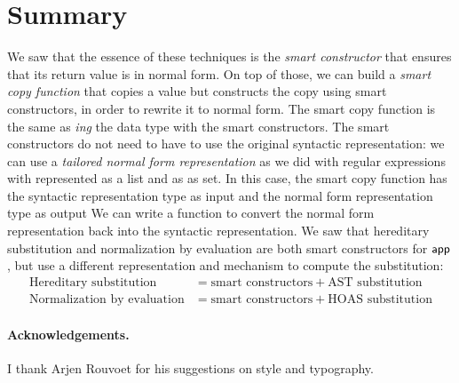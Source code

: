 \section{Summary}

We saw that the essence of these techniques is the \emph{smart constructor} that ensures that its return value is in normal form.
On top of those, we can build a \emph{smart copy function} that copies a value but constructs the copy using smart constructors, in order to rewrite it to normal form.
The smart copy function is the same as \emph{ing} the data type with the smart constructors.
The smart constructors do not need to have to use the original syntactic representation: we can use a \emph{tailored normal form representation} as we did with regular expressions with  represented as a list and  as as set.
In this case, the smart copy function has the syntactic representation type as input and the normal form representation type as output
We can write a  function to convert the normal form representation back into the syntactic representation.
We saw that hereditary substitution and normalization by evaluation are both smart constructors for $\mathsf{app}$,
but use a different representation and mechanism to compute the substitution:
\begin{align*}
  \text{Hereditary substitution} &= \text{smart constructors} + \text{AST substitution} \\
  \text{Normalization by evaluation} &= \text{smart constructors} + \text{HOAS substitution}
\end{align*}

\paragraph{Acknowledgements.} I thank Arjen Rouvoet for his suggestions on style and typography.





